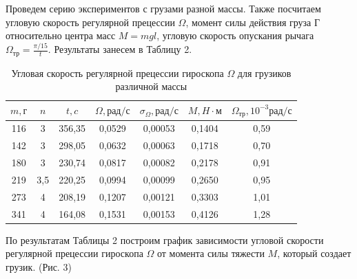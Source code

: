 \documentclass[a4paper,12pt]{article} %
\begin{document}
Проведем серию экспериментов с грузами разной массы. Также посчитаем угловую скорость регулярной прецессии $\Omega$, момент силы действия груза $\text{Г}$ относительно центра масс $M = mgl$, угловую скорость опускания рычага $\Omega_\text{тр} = \frac{\pi/15}{t}$. Результаты занесем в Таблицу 2.
\begin{table}[h]
\centering
\begin{tabular}{|c|c|c|c|c|c|c|}
\hline
$m, \text{г}$   & $n$   & $t, c$      & $\Omega, \text{рад/с}$  & $\sigma_\Omega,\text{рад/с}$     & $M, H\cdot\text{м}$      & $\Omega_\text{тр}, 10^{-3}\text{рад/с}$   \\ \hline
116 & 3   & 356,35 & 0,0529 & 0,00053 & 0,1404 & 0,59 \\ \hline
142 & 3   & 298,05 & 0,0632 & 0,00063 & 0,1718 & 0,70 \\ \hline
180 & 3   & 230,74 & 0,0817 & 0,00082 & 0,2178 & 0,91 \\ \hline
219 & 3,5 & 220,25 & 0,0994 & 0,00099 & 0,2650 & 0,95 \\ \hline
273 & 4   & 208,19 & 0,1207 & 0,00121 & 0,3303 & 1,01 \\ \hline
341 & 4   & 164,08 & 0,1531 & 0,00153 & 0,4126 & 1,28 \\ \hline
\end{tabular}
\caption{Угловая скорость регулярной прецессии гироскопа $\Omega$ для грузиков различной массы}
\end{table}

По результатам Таблицы 2 построим график зависимости угловой скорости регулярной прецессии гироскопа $\Omega$ от момента силы тяжести $M$, который создает грузик. (Рис. 3)
\end{document}
